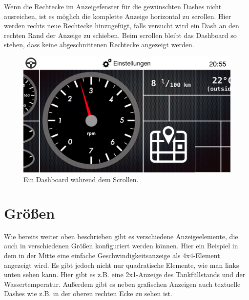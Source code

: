\documentclass[pflichtenheft.tex]{subfiles}
\begin{document}
Wenn die Rechtecke im Anzeigefenster für die gewünschten Dashes nicht ausreichen, ist es möglich die komplette Anzeige horizontal zu scrollen. Hier werden rechts neue Rechtecke hinzugefügt, falls versucht wird ein Dash an den rechten Rand der Anzeige zu schieben. Beim scrollen bleibt das Dashboard so stehen, dass keine abgeschnittenen Rechtecke angezeigt werden. 

\begin{figure}[H]
  	\begin{center}
 		\includegraphics[width=\textwidth]{Images/GUI-DashboardGridScrolling.png}
  		\caption{Ein Dashboard während dem Scrollen.}
  	\end{center}
\end{figure}

\clearpage
\section{Größen}

Wie bereits weiter oben beschrieben gibt es verschiedene Anzeigeelemente, die auch in verschiedenen Größen konfiguriert werden können. Hier ein Beispiel in dem in der Mitte eine einfache Geschwindigkeitsanzeige als 4x4-Element angezeigt wird. 
Es gibt jedoch nicht nur quadratische Elemente, wie man links unten sehen kann. Hier gibt es z.B. eine 2x1-Anzeige des Tankfüllstands und der Wassertemperatur. 
Außerdem gibt es neben grafischen Anzeigen auch textuelle Dashes wie z.B. in der oberen rechten Ecke zu sehen ist.
\end{document}
